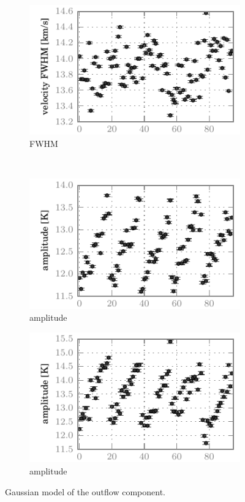 \begin{figure}[hbtp]
    \begin{subfigure}[b]{0.5\textwidth}
        \includegraphics{co98_outf_vfwh}
        \caption{ FWHM}
    \end{subfigure}%
    \\
    \begin{subfigure}[b]{0.5\textwidth}
        \includegraphics{co87_outf_ampl}
        \caption{ amplitude}
    \end{subfigure}%
    \begin{subfigure}[b]{0.5\textwidth}
        \includegraphics{co98_outf_ampl}
        \caption{ amplitude}
    \end{subfigure}%
    \caption{
        Gaussian model of the outflow component.
    }
    \label{fig:fit_outf}
\end{figure}


